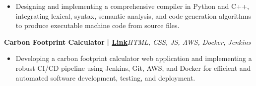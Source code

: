 \documentclass[a4paper]{article}
\begin{document}
          \vspace{-3mm}
\begin{itemize} \itemsep -3pt
\item[] Designing and implementing a comprehensive compiler in Python and C++, integrating lexical, syntax, semantic analysis, and code generation algorithms to produce executable machine code from source files.
\end{itemize}
          \vspace*{3mm}
      {\textbf{Carbon Footprint Calculator}}\textbf{ | \href{https://github.com/Kunal2703/Carbon-Footprint-Tracker}{Link}}\hfill{\sl HTML, CSS, JS, AWS, Docker, Jenkins}\\
          \vspace{-3mm}
\begin{itemize} \itemsep -3pt
\item[] Developing a carbon footprint calculator web application and implementing a robust CI/CD pipeline using Jenkins, Git, AWS, and Docker for efficient and automated software development, testing, and deployment.
\end{itemize}
          \vspace*{3mm}
\end{document}
